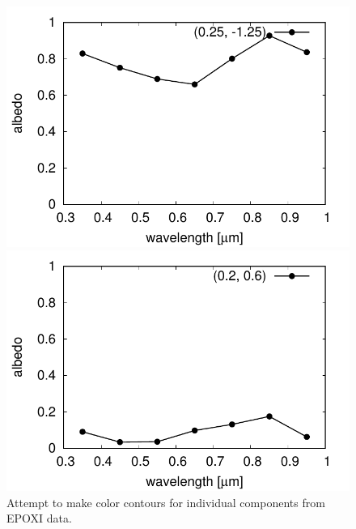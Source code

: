 \documentclass[iop,numberedappendix,apj,]{emulateapj}
\begin{document}
\begin{figure}[tbh!]
   \begin{minipage}{0.33\hsize}
    \begin{center}
	\includegraphics[width=\hsize]{raddata_2_norm_noreg_1_sp.pdf}
    \end{center}	
   \end{minipage}
   \begin{minipage}{0.33\hsize}
    \begin{center}
	\includegraphics[width=\hsize]{raddata_2_norm_noreg_2_sp.pdf}
    \end{center}	
   \end{minipage}    \caption{Attempt to make color contours for individual components from EPOXI data. }
\label{fig:EPOXI_individual}
\end{figure}
\end{document}
